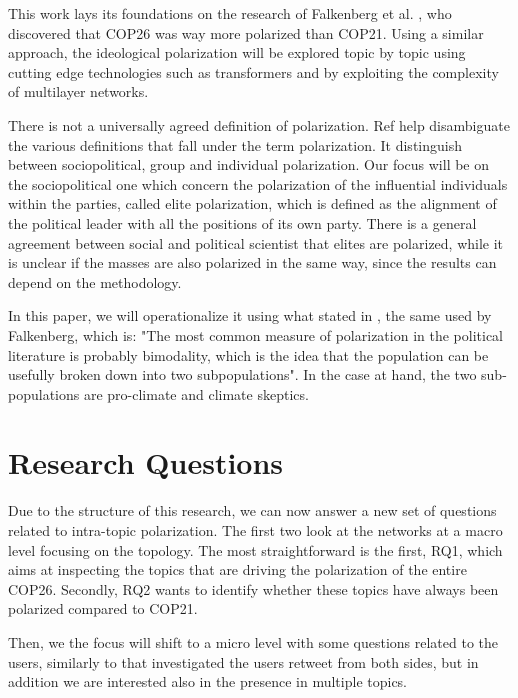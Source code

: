 This work lays its foundations on the research of Falkenberg et al. \cite{falkenberg_growing_2022}, who discovered that COP26 was way more polarized than COP21. Using a similar approach, the ideological polarization will be explored topic by topic using cutting edge technologies such as transformers and by exploiting the complexity of multilayer networks. 

There is not a universally agreed definition of polarization. Ref \cite{madgalena_polarization} help disambiguate the various definitions that fall under the term polarization. It distinguish between sociopolitical, group and individual polarization. Our focus will be on the sociopolitical one which concern the polarization of the influential individuals within the parties,  called elite polarization, which is defined  as the alignment of the political leader with all the positions of its own party. There is a general agreement between social and political scientist that elites are polarized, while it is unclear  if the masses are also polarized in the same way, since the results can depend on the methodology.



In this paper, we will operationalize it using what stated in \cite{bramson_understanding_2017}, the same used by Falkenberg, which is: "The most common measure of polarization in the political literature is probably bimodality, which is the idea that the population can be usefully broken down into two subpopulations". 
In the case at hand, the two sub-populations are pro-climate and climate skeptics.



\section{Research Questions}
Due to the structure of this research, we can now answer a new set of questions related to intra-topic polarization. The first two look at the networks at a macro level focusing on the topology. The most straightforward is the first, RQ1, which aims at inspecting the topics that are driving the polarization of the entire COP26. Secondly, RQ2 wants to identify whether these topics have always been polarized compared to COP21.

Then, we the focus will shift to a micro level with some questions related to the users, similarly to 
\cite{garimella2017longterm} that  investigated the users retweet from both sides, but in addition we are interested also in the presence in multiple topics.

